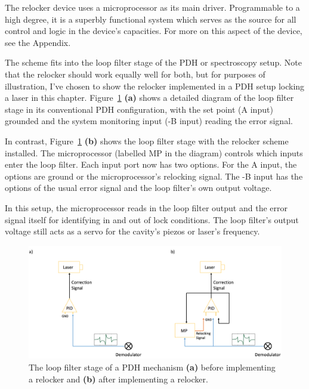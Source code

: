 \documentclass[10pt]{report}
\begin{document}
The relocker device uses a microprocessor as its main driver. Programmable to a high degree, it is a superbly functional system which serves as the source for all control and logic in the device's capacities. For more on this aspect of the device, see the Appendix.

The scheme fits into the loop filter stage of the PDH or spectroscopy setup. Note that the relocker should work equally well for both, but for purposes of illustration, I've chosen to show the relocker implemented in a PDH setup locking a laser in this chapter. Figure~\ref{fig:relocker_structure} \textbf{(a)} shows a detailed diagram of the loop filter stage in its conventional PDH configuration, with the set point (A input) grounded and the system monitoring input (-B input) reading the error signal. 

In contrast, Figure~\ref{fig:relocker_structure} \textbf{(b)} shows the loop filter stage with the relocker scheme installed. The microprocessor (labelled MP in the diagram) controls which inputs enter the loop filter. Each input port now has two options. For the A input, the options are ground or the microprocessor's relocking signal. The -B input has the options of the usual error signal and the loop filter's own output voltage. 

In this setup, the microprocessor reads in the loop filter output and the error signal itself for identifying in and out of lock conditions. The loop filter's output voltage still acts as a servo for the cavity's piezos or laser's frequency.

\begin{figure}[h!]
	\includegraphics[scale=.33]{includes/relocker_structure}
	\centering
	\caption{The loop filter stage of a PDH mechanism \textbf{(a)} before implementing a relocker and \textbf{(b)} after implementing a relocker.}
	\label{fig:relocker_structure}
\end{figure}
\end{document}

